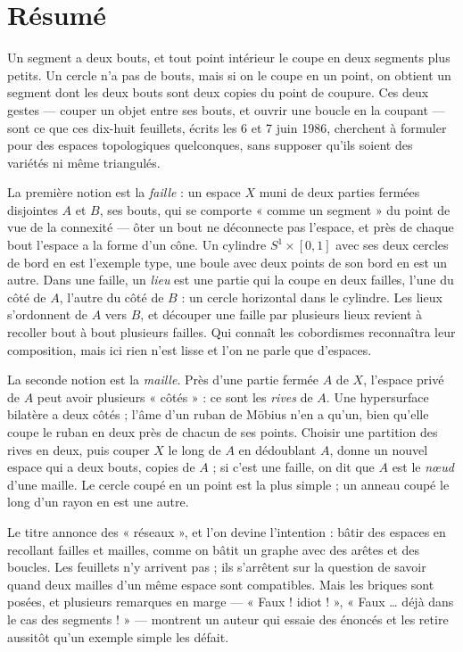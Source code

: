 \documentclass[11pt,a4paper]{article}
\begin{document}
\section*{Résumé}

\begin{resume}
Un segment a deux bouts, et tout point intérieur le coupe en deux segments
plus petits. Un cercle n'a pas de bouts, mais si on le coupe en un point, on
obtient un segment dont les deux bouts sont deux copies du point de coupure.
Ces deux gestes --- couper un objet entre ses bouts, et ouvrir une boucle en
la coupant --- sont ce que ces dix-huit feuillets, écrits les 6 et 7 juin 1986,
cherchent à formuler pour des espaces topologiques quelconques, sans
supposer qu'ils soient des variétés ni même triangulés.

La première notion est la \emph{faille} : un espace $X$ muni de deux parties
fermées disjointes $A$ et $B$, ses bouts, qui se comporte « comme un segment »
du point de vue de la connexité --- ôter un bout ne déconnecte pas l'espace,
et près de chaque bout l'espace a la forme d'un cône. Un cylindre
$S^{1} \times [0,1]$ avec ses deux cercles de bord en est l'exemple type, une
boule avec deux points de son bord en est un autre. Dans une faille, un
\emph{lieu} est une partie qui la coupe en deux failles, l'une du côté de $A$,
l'autre du côté de $B$ : un cercle horizontal dans le cylindre. Les lieux
s'ordonnent de $A$ vers $B$, et découper une faille par plusieurs lieux
revient à recoller bout à bout plusieurs failles. Qui connaît les cobordismes
reconnaîtra leur composition, mais ici rien n'est lisse et l'on ne parle que
d'espaces.

La seconde notion est la \emph{maille}. Près d'une partie fermée $A$ de $X$,
l'espace privé de $A$ peut avoir plusieurs « côtés » : ce sont les
\emph{rives} de $A$. Une hypersurface bilatère a deux côtés ; l'âme d'un ruban
de Möbius n'en a qu'un, bien qu'elle coupe le ruban en deux près de chacun de ses
points. Choisir une partition
des rives en deux, puis couper $X$ le long de $A$ en dédoublant $A$, donne un
nouvel espace qui a deux bouts, copies de $A$ ; si c'est une faille, on dit que
$A$ est le \emph{nœud} d'une maille. Le cercle coupé en un point est la plus
simple ; un anneau coupé le long d'un rayon en est une autre.

Le titre annonce des « réseaux », et l'on devine l'intention : bâtir des
espaces en recollant failles et mailles, comme on bâtit un graphe avec des
arêtes et des boucles. Les feuillets n'y arrivent pas ; ils s'arrêtent sur la
question de savoir quand deux mailles d'un même espace sont compatibles. Mais
les briques sont posées, et plusieurs remarques en marge --- « Faux ! idiot ! »,
« Faux … déjà dans le cas des segments ! » --- montrent un auteur qui
essaie des énoncés et les retire aussitôt qu'un exemple simple les défait.

\end{resume}
\end{document}
